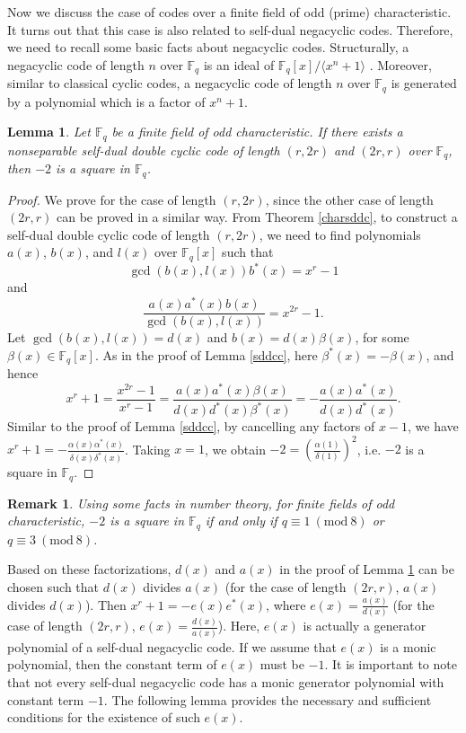 \documentclass[12pt]{article}
\newtheorem{lemma}[theorem]{Lemma}
\newtheorem{remark}{Remark}
\newcommand{\Mod}[1]{\ (\mathrm{mod}\ #1)}
\begin{document}
	Now we discuss the case of codes over a finite field of odd (prime) characteristic. It turns out that this case is also related to self-dual negacyclic codes. Therefore, we need to recall some basic facts about negacyclic codes. Structurally, a negacyclic code of length $n$ over $\mathbb{F}_{q}$ is an ideal of $\mathbb{F}_{q}[x]/\langle x^n+1\rangle$ \cite{Guenda2012,Jitman2020}. Moreover, similar to classical cyclic codes, a negacyclic code of length $n$ over $\mathbb{F}_{q}$ is generated by a polynomial which is a factor of $x^n+1$.
	\begin{lemma}\label{sddcc2}
		Let $\mathbb{F}_q$ be a finite field of odd characteristic. If there exists a nonseparable self-dual double cyclic code of length $(r,2r)$ and $(2r,r)$ over $\mathbb{F}_q$, then $-2$ is a square in $\mathbb{F}_q$.
	\end{lemma}
	\begin{proof}
		We prove for the case of length $(r,2r)$, since the other case of length $(2r,r)$ can be proved in a similar way. From Theorem \ref{charsddc}, to construct a self-dual double cyclic code of length $(r,2r)$, we need to find polynomials $a(x)$, $b(x)$, and $l(x)$ over $\mathbb{F}_q[x]$ such that $$\gcd(b(x),l(x)) b^{*}(x) = x^r-1$$
		and $$\frac{a(x)a^{*}(x)b(x)}{\gcd(b(x),l(x))}=x^{2r}-1.$$
		Let $\gcd(b(x),l(x))=d(x)$ and $b(x)=d(x)\beta(x)$, for some $\beta(x)\in\mathbb{F}_q[x]$. As in the proof of Lemma \ref{sddcc}, here $\beta^{*}(x)=-\beta(x)$, and hence $$x^r+1=\frac{x^{2r}-1}{x^r-1}=\frac{a(x)a^{*}(x)\beta(x)}{d(x)d^{*}(x)\beta^{*}(x)}=-\frac{a(x)a^{*}(x)}{d(x)d^{*}(x)}.$$
		Similar to the proof of Lemma \ref{sddcc}, by cancelling any factors of $x-1$, we have $x^r+1=-\frac{\alpha(x)\alpha^{*}(x)}{\delta(x)\delta^{*}(x)}$. Taking $x=1$, we obtain $-2=\left(\frac{\alpha(1)}{\delta(1)}\right)^2$, i.e. $-2$ is a square in $\mathbb{F}_q$.
	\end{proof}
	\begin{remark}
		Using some facts in number theory, for finite fields of odd characteristic, $-2$ is a square in $\mathbb{F}_q$ if and only if $q\equiv 1\Mod{8}$ or $q\equiv 3\Mod{8}$.
	\end{remark}
	Based on these factorizations, $d(x)$ and $a(x)$ in the proof of Lemma \ref{sddcc2} can be chosen such that $d(x)$ divides $a(x)$ (for the case of length $(2r,r)$, $a(x)$ divides $d(x)$). Then $x^r+1=-e(x)e^{*}(x)$, where $e(x)=\frac{a(x)}{d(x)}$ (for the case of length $(2r,r)$, $e(x)=\frac{d(x)}{a(x)}$). Here, $e(x)$ is actually a generator polynomial of a self-dual negacyclic code. If we assume that $e(x)$ is a monic polynomial, then the constant term of $e(x)$ must be $-1$. It is important to note that not every self-dual negacyclic code has a monic generator polynomial with constant term $-1$. The following lemma provides the necessary and sufficient conditions for the existence of such $e(x)$.
\end{document}
